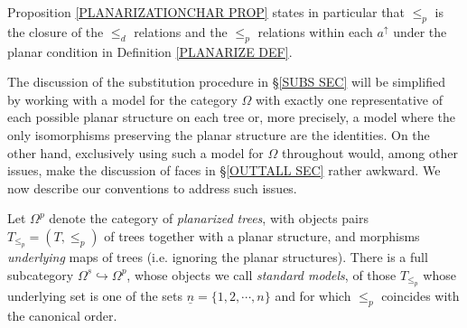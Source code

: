 \documentclass[a4paper,10pt]{article}%
\begin{document}
\begin{remark}\label{CLOSURE REM}
Proposition \ref{PLANARIZATIONCHAR PROP} states in particular that $\leq_p$
is the closure of the $\leq_d$ relations  
and the $\leq_p$ relations within each
$a^{\uparrow}$
under the planar condition in 
Definition \ref{PLANARIZE DEF}.
\end{remark}


The discussion of the substitution procedure in \S \ref{SUBS SEC} 
will be simplified by working with 
a model for the category $\Omega$
with exactly one representative
of each possible planar structure on each tree or, more precisely, a model where the only isomorphisms preserving the planar structure are the identities.
On the other hand, exclusively using such a model for $\Omega$ throughout would, among other issues, make the discussion of faces in \S \ref{OUTTALL SEC} rather awkward.
We now describe our conventions to address such issues.

Let $\Omega^p$ denote the category of \textit{planarized trees},
with objects pairs $T_{\leq_p}=(T,\leq_p)$ of trees together with a planar structure,
and morphisms \textit{underlying} maps of trees (i.e. ignoring the planar structures).
There is a full subcategory $\Omega^s \hookrightarrow \Omega^p$, whose objects we call \textit{standard models}, of those $T_{\leq_p}$ whose underlying set is one of the sets $\underline{n} = \{1,2,\cdots,n\}$ and for which $\leq_p$ coincides with the canonical order.
\end{document}
